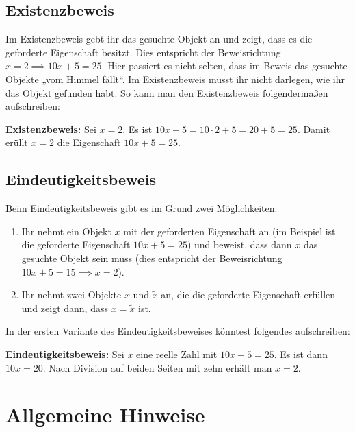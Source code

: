 \documentclass[a4paper]{article}
\begin{document}
\subsection{Existenzbeweis}

Im Existenzbeweis gebt ihr das gesuchte Objekt an und zeigt, dass es die geforderte Eigenschaft besitzt. Dies entspricht der Beweisrichtung $x=2 \implies 10x+5=25$. Hier passiert es nicht selten, dass im Beweis das gesuchte Objekte „vom Himmel fällt“. Im Existenzbeweis müsst ihr nicht darlegen, wie ihr das Objekt gefunden habt. So kann man den Existenzbeweis folgendermaßen aufschreiben:

\begin{addmargin}{2cm}
  \textbf{Existenzbeweis:} Sei $x=2$. Es ist $10x+5=10\cdot 2+5=20+5=25$. Damit erüllt $x=2$ die Eigenschaft $10x+5=25$.
\end{addmargin}

\subsection{Eindeutigkeitsbeweis}

Beim Eindeutigkeitsbeweis gibt es im Grund zwei Möglichkeiten:

\begin{enumerate}
  \item Ihr nehmt ein Objekt $x$ mit der geforderten Eigenschaft an (im Beispiel ist die geforderte Eigenschaft $10x+5=25$) und beweist, dass dann $x$ das gesuchte Objekt sein muss (dies entspricht der Beweisrichtung $10x+5=15\implies x=2$).
  \item Ihr nehmt zwei Objekte $x$ und $\tilde x$ an, die die geforderte Eigenschaft erfüllen und zeigt dann, dass $x=\tilde x$ ist.
\end{enumerate}

In der ersten Variante des Eindeutigkeitsbeweises könntest folgendes aufschreiben:

\begin{addmargin}{2cm}
  \textbf{Eindeutigkeitsbeweis:} Sei $x$ eine reelle Zahl mit $10x+5=25$. Es ist dann $10x=20$. Nach Division auf beiden Seiten mit zehn erhält man $x=2$.
\end{addmargin}

\section{Allgemeine Hinweise}
\end{document}
